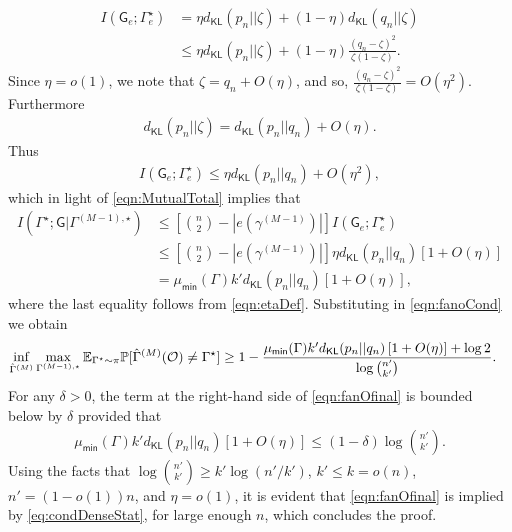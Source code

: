 \documentclass[12pt]{article}
\newcommand{\bE}{\mathbb{E}}
\newcommand {\pr} {\mathbb{P}}
\newcommand{\calO}{{\cal O}}
\newcommand{\pp}[1]{\left[#1\right]}
\newcommand{\s}[1]{\mathsf{#1}}
\begin{document}
\begin{align}
   I(\s{G}_e;\Gamma^\star_e) &= \eta d_{\s{KL}}(p_n||\zeta)+(1-\eta) d_{\s{KL}}(q_n||\zeta)\\
   &\leq \eta d_{\s{KL}}(p_n||\zeta)+(1-\eta) \frac{(q_n-\zeta)^2}{\zeta(1-\zeta)}.
\end{align}
Since $\eta=o(1)$, we note that $\zeta = q_n+O(\eta)$, and so, $\frac{(q_n-\zeta)^2}{\zeta(1-\zeta)} = O(\eta^2)$. Furthermore
\begin{align}
    d_{\s{KL}}(p_n||\zeta) = d_{\s{KL}}(p_n||q_n)+O(\eta).
\end{align}
Thus
\begin{align}
    I(\s{G}_e;\Gamma^\star_e)\leq \eta d_{\s{KL}}(p_n||q_n)+O(\eta^2),
\end{align}
which in light of \eqref{eqn:MutualTotal} implies that
\begin{align}
    I(\Gamma^\star; \s{G} \vert\Gamma^{(M-1),\star})&\leq \pp{\binom{n}{2}-|e(\gamma^{(M-1)})|}I(\s{G}_e;\Gamma^\star_e)\\
    &\leq \pp{\binom{n}{2}-|e(\gamma^{(M-1)})|}\eta d_{\s{KL}}(p_n||q_n)\pp{1+O(\eta)}\\
    & = \mu_{\s{min}}(\Gamma)k'd_{\s{KL}}(p_n||q_n)\pp{1+O(\eta)},
\end{align}
where the last equality follows from \eqref{eqn:etaDef}. Substituting in \eqref{eqn:fanoCond} we obtain
\begin{align}
    \inf_{\hat{\Gamma}^{(M)}}\max_{\Gamma^{(M-1),\star}}\bE_{\Gamma^{\star}\sim\pi}\pr[\hat{\Gamma}^{(M)}(\calO)\neq\Gamma^{\star}]&\geq 1-\frac{\mu_{\s{min}}(\Gamma)k'd_{\s{KL}}(p_n||q_n)\pp{1+O(\eta)} + \log 2}{\log\binom{n'}{k'}}.\label{eqn:fanOfinal}
\end{align}
For any $\delta>0$, the term at the right-hand side of \eqref{eqn:fanOfinal} is bounded below by $\delta$ provided that
\begin{align}
    \mu_{\s{min}}(\Gamma)k'd_{\s{KL}}(p_n||q_n)\pp{1+O(\eta)}\leq (1-\delta)\log\binom{n'}{k'}.\label{eqn:fanOfinal2}
\end{align}
Using the facts that $\log\binom{n'}{k'}\geq k'\log(n'/k')$, $k'\leq k = o(n)$, $n' = (1-o(1))n$, and $\eta=o(1)$, it is evident that \eqref{eqn:fanOfinal} is implied by \eqref{eq:condDenseStat}, for large enough $n$, which concludes the proof. 
\end{document}
